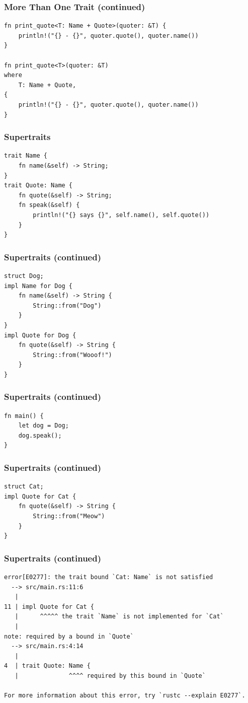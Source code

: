 \documentclass{slides}
\begin{document}
\begin{frame}[fragile]
\frametitle{More Than One Trait (continued)}
\begin{verbatim}
fn print_quote<T: Name + Quote>(quoter: &T) {
    println!("{} - {}", quoter.quote(), quoter.name())
}

fn print_quote<T>(quoter: &T)
where
    T: Name + Quote,
{
    println!("{} - {}", quoter.quote(), quoter.name())
}
\end{verbatim}
\end{frame}

\begin{frame}[fragile]
\frametitle{Supertraits}
\begin{verbatim}
trait Name {
    fn name(&self) -> String;
}
trait Quote: Name {
    fn quote(&self) -> String;
    fn speak(&self) {
        println!("{} says {}", self.name(), self.quote())
    }
}
\end{verbatim}
\end{frame}

\begin{frame}[fragile]
\frametitle{Supertraits (continued)}
\begin{verbatim}
struct Dog;
impl Name for Dog {
    fn name(&self) -> String {
        String::from("Dog")
    }
}
impl Quote for Dog {
    fn quote(&self) -> String {
        String::from("Wooof!")
    }
}
\end{verbatim}
\end{frame}

\begin{frame}[fragile]
\frametitle{Supertraits (continued)}
\begin{verbatim}
fn main() {
    let dog = Dog;
    dog.speak();
}
\end{verbatim}
\end{frame}

\begin{frame}[fragile]
\frametitle{Supertraits (continued)}
\begin{verbatim}
struct Cat;
impl Quote for Cat {
    fn quote(&self) -> String {
        String::from("Meow")
    }
}
\end{verbatim}
\end{frame}

\begin{frame}[fragile]
\frametitle{Supertraits (continued)}
\begin{verbatim}
error[E0277]: the trait bound `Cat: Name` is not satisfied
  --> src/main.rs:11:6
   |
11 | impl Quote for Cat {
   |      ^^^^^ the trait `Name` is not implemented for `Cat`
   |
note: required by a bound in `Quote`
  --> src/main.rs:4:14
   |
4  | trait Quote: Name {
   |              ^^^^ required by this bound in `Quote`

For more information about this error, try `rustc --explain E0277`.
\end{verbatim}
\end{frame}
\end{document}
